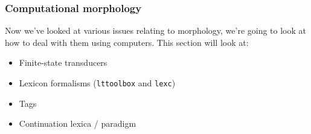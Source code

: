 \documentclass[10pt,xetex]{beamer} %
\begin{document}
\begin{frame}
  \frametitle{Computational morphology}

Now we've looked at various issues relating to morphology, we're going
to look at how to deal with them using computers. This section will look
at:

\begin{itemize}

  \item Finite-state transducers

  \item Lexicon formalisms ({\tt lttoolbox} and {\tt lexc})

  \item Tags

  \item Continuation lexica / paradigm


\end{itemize}

\end{frame}
\end{document}
